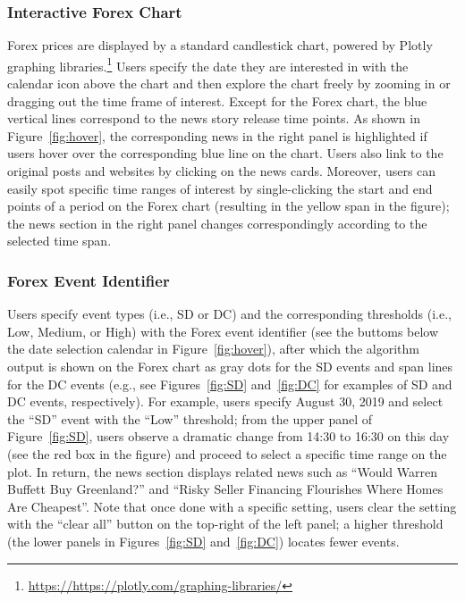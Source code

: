 \documentclass[sigconf]{acmart}
\begin{document}
\subsubsection{Interactive Forex Chart}
Forex prices are displayed by a standard candlestick chart, powered by
Plotly graphing
libraries.\footnote{\url{https://https://plotly.com/graphing-libraries/}}
Users specify the date they are interested in with the calendar icon above
the chart and then explore the chart freely by zooming in or dragging out the
time frame of interest.
Except for the Forex chart, the blue vertical lines correspond to the news story
release time points. 
As shown in Figure~\ref{fig:hover}, the corresponding news in the right panel
is highlighted if users hover over the corresponding blue line on the chart.
Users also link to the original posts and websites by clicking on the news
cards.
Moreover, users can easily spot specific time ranges of interest
by single-clicking the start and end points of a period on the Forex chart
(resulting in the yellow span in the figure); the news section in the right
panel changes correspondingly according to the selected time span.


\subsubsection{Forex Event Identifier}
Users specify event types (i.e., SD or DC)  and the corresponding thresholds (i.e., Low, Medium, or High) with the Forex event identifier (see the buttoms below the date selection calendar in Figure~\ref{fig:hover}), after which the algorithm output is shown on the Forex chart as
gray dots for the SD events and span lines for the DC events (e.g., see
Figures~\ref{fig:SD} and~\ref{fig:DC} for examples of SD and DC events,
respectively).
For example, users specify August 30, 2019 and select the ``SD'' event with
the ``Low'' threshold; from the upper panel of Figure~\ref{fig:SD}, users 
observe a dramatic change from 14:30 to 16:30 on this day (see the red box in the figure) and 
proceed to select a specific time range on the plot. 
In return, the news section displays related news such as ``Would Warren
Buffett Buy Greenland?'' and ``Risky Seller Financing Flourishes Where Homes
Are Cheapest''. 
Note that once done with a specific setting, users clear the setting with
the ``clear all'' button on the top-right of the left panel;
a higher threshold (the lower panels in Figures~\ref{fig:SD}
and~\ref{fig:DC}) locates fewer events.
\end{document}
